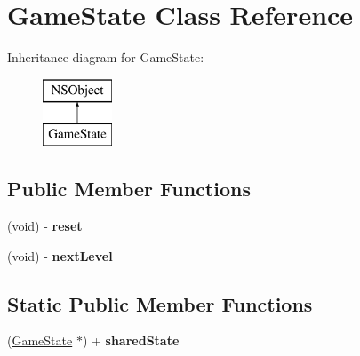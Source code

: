 \hypertarget{interface_game_state}{\section{Game\-State Class Reference}
\label{interface_game_state}
}
Inheritance diagram for Game\-State\-:\begin{figure}[H]
\begin{center}
\leavevmode
\includegraphics[height=2.000000cm]{interface_game_state}
\end{center}
\end{figure}
\subsection*{Public Member Functions}
\begin{DoxyCompactItemize}
\item 
\hypertarget{interface_game_state_a667c26a355b1b1850cd4a308cc2a337c}{(void) -\/ {\bfseries reset}}\label{interface_game_state_a667c26a355b1b1850cd4a308cc2a337c}

\item 
\hypertarget{interface_game_state_a21c19638318d807028bdb2199d2fe130}{(void) -\/ {\bfseries next\-Level}}\label{interface_game_state_a21c19638318d807028bdb2199d2fe130}

\end{DoxyCompactItemize}
\subsection*{Static Public Member Functions}
\begin{DoxyCompactItemize}
\item 
\hypertarget{interface_game_state_ae6334a578304103ff65373e236404da3}{(\hyperlink{interface_game_state}{Game\-State} $\ast$) + {\bfseries shared\-State}}\label{interface_game_state_ae6334a578304103ff65373e236404da3}

\end{DoxyCompactItemize}
